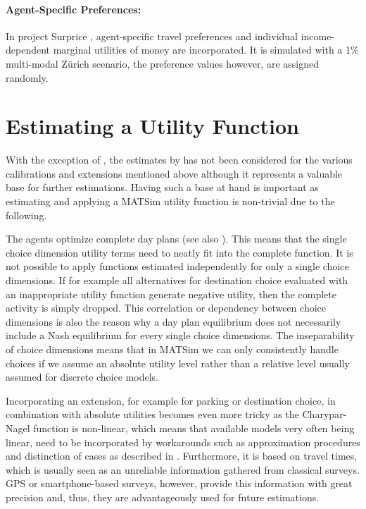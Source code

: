 \paragraph{Agent-Specific Preferences:}
In project Surprice \citet[][]{HorniEtAl_TechRep_IVT_2012_a, HorniAxhausen_TechRep_IVT_2014}, agent-specific travel preferences and individual income-dependent marginal utilities of money are incorporated. It is simulated with a 1\% multi-modal Zürich scenario, the preference values however, are assigned randomly. 

\section{Estimating a Utility Function}
\label{sec:estimation}
With the exception of \citet[][]{BalmerEtAl_ResRep_datapuls_2010}, the estimates by \citet[][]{Kickhoefer_MastersThesis_2009} has not been considered for the various calibrations and extensions mentioned above although it represents a valuable base for further estimations. Having such a base at hand is important as estimating and applying a MATSim utility function is non-trivial due to the following. 

The agents optimize complete day plans (see also \citet[][Section 6.3.1]{MATSim_Userguide_2014}). This means that the single choice dimension utility terms need to neatly fit into the complete function. It is not possible to apply functions estimated independently for only a single choice dimensions. If for example all alternatives for destination choice evaluated with an inappropriate utility function generate negative utility, then the complete activity is simply dropped. This correlation or dependency between choice dimensions is also the reason why a day plan equilibrium does not necessarily include a Nash equilibrium for every single choice dimensions. The inseparability of choice dimensions means that in MATSim we can only consistently handle choices if we assume an absolute utility level rather than a relative level usually assumed for discrete choice models. 

Incorporating an extension, for example for parking or destination choice, in combination with absolute utilities becomes even more tricky as the Charypar-Nagel function is non-linear, which means that available models very often being linear, need to be incorporated by workarounds such as approximation procedures and distinction of cases as described in \citet[][p.75ff]{Horni_PhDThesis_2013}. Furthermore, it is based on travel times, which is usually seen as an unreliable information gathered from classical surveys. GPS or smartphone-based surveys, however, provide this information with great precision and, thus, they are advantageously used for future estimations.

